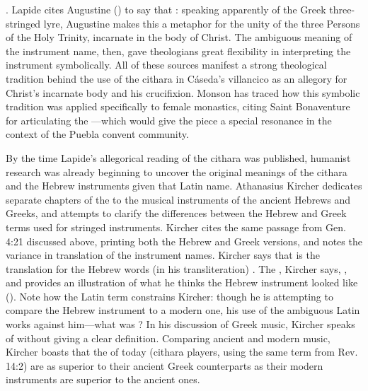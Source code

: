 .%
    \Autocite[370]{Lapide:1Samuel}
Lapide cites Augustine () to say that : speaking apparently of the Greek
three-stringed lyre, Augustine makes this a metaphor for the unity of the three
Persons of the Holy Trinity, incarnate in the body of Christ.%
    \Autocite[370]{Lapide:1Samuel}
The ambiguous meaning of the instrument name, then, gave theologians great
flexibility in interpreting the instrument symbolically.
All of these sources manifest a strong theological tradition behind the use of
the cithara in Cáseda's villancico as an allegory for Christ's incarnate body
and his crucifixion.  
Monson has traced how this symbolic tradition was applied specifically to
female monastics, citing Saint Bonaventure for articulating the
---which would give the piece a special resonance in the
context of the Puebla convent community.%
    \Autocite[93--94]{Monson:DivasConvent}


By the time Lapide's allegorical reading of the cithara was published, humanist
research was already beginning to uncover the original meanings of the cithara
and the Hebrew instruments given that Latin name.
Athanasius Kircher dedicates separate chapters of the  to the
musical instruments of the ancient Hebrews and Greeks, and attempts to clarify
the differences between the Hebrew and Greek terms used for stringed
instruments.
Kircher cites the same passage from Gen. 4:21 discussed above, printing both
the Hebrew and Greek versions, and notes the variance in translation of the
instrument names.
Kircher says that  is the translation for the Hebrew words (in
his transliteration) .
The , Kircher says, , and provides an illustration of what he thinks
the Hebrew instrument looked like ().%
    \autocite[, 44--49]{Kircher:Musurgia} 
Note how the Latin term constrains Kircher: though he is attempting to compare
the Hebrew instrument to a modern one, his use of the ambiguous Latin
 works against him---what was ?
In his discussion of Greek music, Kircher speaks of  without
giving a clear definition.
Comparing ancient and modern music, Kircher boasts that the
 of today (cithara players, using the same term from Rev.
14:2) are as superior to their ancient Greek counterparts as their modern
instruments are superior to the ancient ones.
    \Autocite[, 548]{Kircher:Musurgia}

